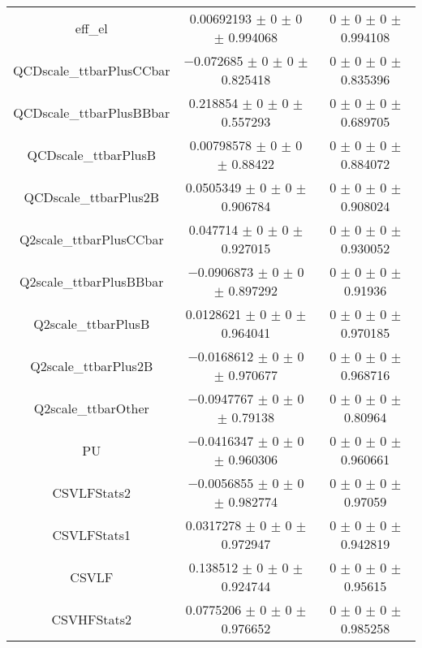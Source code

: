 \begin{table}
\begin{tabular}{ccc}
eff\_el & \num{0.00692193} $\pm$ \num{0} $\pm$ \num{0} $\pm$ \num{0.994068} & \num{0} $\pm$ \num{0} $\pm$ \num{0} $\pm$ \num{0.994108}\\
QCDscale\_ttbarPlusCCbar & \num{-0.072685} $\pm$ \num{0} $\pm$ \num{0} $\pm$ \num{0.825418} & \num{0} $\pm$ \num{0} $\pm$ \num{0} $\pm$ \num{0.835396}\\
QCDscale\_ttbarPlusBBbar & \num{0.218854} $\pm$ \num{0} $\pm$ \num{0} $\pm$ \num{0.557293} & \num{0} $\pm$ \num{0} $\pm$ \num{0} $\pm$ \num{0.689705}\\
QCDscale\_ttbarPlusB & \num{0.00798578} $\pm$ \num{0} $\pm$ \num{0} $\pm$ \num{0.88422} & \num{0} $\pm$ \num{0} $\pm$ \num{0} $\pm$ \num{0.884072}\\
QCDscale\_ttbarPlus2B & \num{0.0505349} $\pm$ \num{0} $\pm$ \num{0} $\pm$ \num{0.906784} & \num{0} $\pm$ \num{0} $\pm$ \num{0} $\pm$ \num{0.908024}\\
Q2scale\_ttbarPlusCCbar & \num{0.047714} $\pm$ \num{0} $\pm$ \num{0} $\pm$ \num{0.927015} & \num{0} $\pm$ \num{0} $\pm$ \num{0} $\pm$ \num{0.930052}\\
Q2scale\_ttbarPlusBBbar & \num{-0.0906873} $\pm$ \num{0} $\pm$ \num{0} $\pm$ \num{0.897292} & \num{0} $\pm$ \num{0} $\pm$ \num{0} $\pm$ \num{0.91936}\\
Q2scale\_ttbarPlusB & \num{0.0128621} $\pm$ \num{0} $\pm$ \num{0} $\pm$ \num{0.964041} & \num{0} $\pm$ \num{0} $\pm$ \num{0} $\pm$ \num{0.970185}\\
Q2scale\_ttbarPlus2B & \num{-0.0168612} $\pm$ \num{0} $\pm$ \num{0} $\pm$ \num{0.970677} & \num{0} $\pm$ \num{0} $\pm$ \num{0} $\pm$ \num{0.968716}\\
Q2scale\_ttbarOther & \num{-0.0947767} $\pm$ \num{0} $\pm$ \num{0} $\pm$ \num{0.79138} & \num{0} $\pm$ \num{0} $\pm$ \num{0} $\pm$ \num{0.80964}\\
PU & \num{-0.0416347} $\pm$ \num{0} $\pm$ \num{0} $\pm$ \num{0.960306} & \num{0} $\pm$ \num{0} $\pm$ \num{0} $\pm$ \num{0.960661}\\
CSVLFStats2 & \num{-0.0056855} $\pm$ \num{0} $\pm$ \num{0} $\pm$ \num{0.982774} & \num{0} $\pm$ \num{0} $\pm$ \num{0} $\pm$ \num{0.97059}\\
CSVLFStats1 & \num{0.0317278} $\pm$ \num{0} $\pm$ \num{0} $\pm$ \num{0.972947} & \num{0} $\pm$ \num{0} $\pm$ \num{0} $\pm$ \num{0.942819}\\
CSVLF & \num{0.138512} $\pm$ \num{0} $\pm$ \num{0} $\pm$ \num{0.924744} & \num{0} $\pm$ \num{0} $\pm$ \num{0} $\pm$ \num{0.95615}\\
CSVHFStats2 & \num{0.0775206} $\pm$ \num{0} $\pm$ \num{0} $\pm$ \num{0.976652} & \num{0} $\pm$ \num{0} $\pm$ \num{0} $\pm$ \num{0.985258}\\

\end{tabular}
\end{table}
